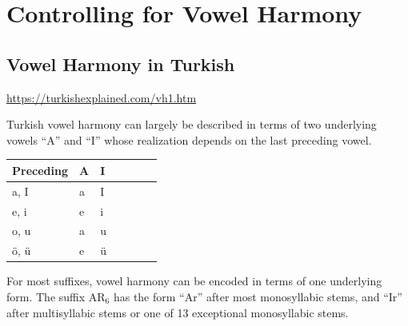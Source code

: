 \documentclass[11pt,letterpaper]{article}
\begin{document}
\section{Controlling for Vowel Harmony}
\subsection{Vowel Harmony in Turkish}

\url{https://turkishexplained.com/vh1.htm}


Turkish vowel harmony can largely be described in terms of two underlying vowels ``A'' and ``I'' whose realization depends on the last preceding vowel.



    \begin{tabular}{l|llllll}
        Preceding & A & I \\ \hline
        a, I & a & I \\
        e, i & e & i \\
        o, u & a & u \\
        {\"o}, {\"u} & e & {\"u}
    \end{tabular}
    
For most suffixes, vowel harmony can be encoded in terms of one underlying form.
The suffix AR$_6$ has the form ``Ar'' after most monosyllabic stems, and ``Ir'' after multisyllabic stems or one of 13 exceptional monosyllabic stems.
\end{document}
